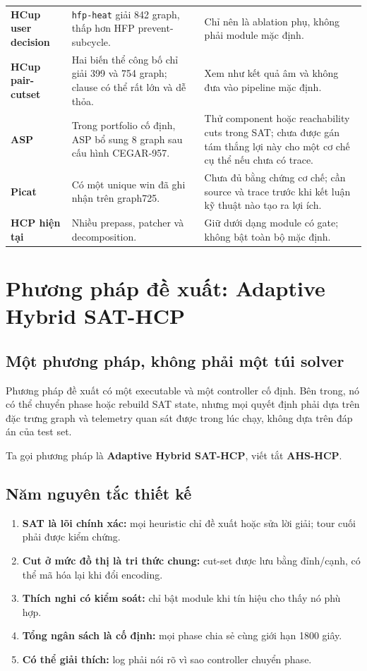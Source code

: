 \documentclass[11pt,a4paper,oneside]{scrreprt}
\newcommand{\code}[1]{\texttt{#1}}
\begin{document}
\begin{longtable}{>{\raggedright\arraybackslash\bfseries\sffamily}p{28mm} >{\raggedright\arraybackslash}p{50mm} >{\raggedright\arraybackslash}p{66mm}}
HCup user decision & \code{hfp-heat} giải 842 graph, thấp hơn HFP prevent-subcycle. & Chỉ nên là ablation phụ, không phải module mặc định. \\
HCup pair-cutset & Hai biến thể công bố chỉ giải 399 và 754 graph; clause có thể rất lớn và dễ thỏa. & Xem như kết quả âm và không đưa vào pipeline mặc định. \\
ASP & Trong portfolio cố định, ASP bổ sung 8 graph sau cấu hình CEGAR-957. & Thử component hoặc reachability cuts trong SAT; chưa được gán tám thắng lợi này cho một cơ chế cụ thể nếu chưa có trace. \\
Picat & Có một unique win đã ghi nhận trên graph725. & Chưa đủ bằng chứng cơ chế; cần source và trace trước khi kết luận kỹ thuật nào tạo ra lợi ích. \\
HCP hiện tại & Nhiều prepass, patcher và decomposition. & Giữ dưới dạng module có gate; không bật toàn bộ mặc định. \\
\bottomrule
\end{longtable}

\chapter{Phương pháp đề xuất: Adaptive Hybrid SAT-HCP}

\section{Một phương pháp, không phải một túi solver}

Phương pháp đề xuất có một executable và một controller cố định. Bên trong, nó có thể chuyển phase hoặc rebuild SAT state, nhưng mọi quyết định phải dựa trên đặc trưng graph và telemetry quan sát được trong lúc chạy, không dựa trên đáp án của test set.

Ta gọi phương pháp là \textbf{Adaptive Hybrid SAT-HCP}, viết tắt \textbf{AHS-HCP}.

\section{Năm nguyên tắc thiết kế}

\begin{enumerate}
  \item \textbf{SAT là lõi chính xác:} mọi heuristic chỉ đề xuất hoặc sửa lời giải; tour cuối phải được kiểm chứng.
  \item \textbf{Cut ở mức đồ thị là tri thức chung:} cut-set được lưu bằng đỉnh/cạnh, có thể mã hóa lại khi đổi encoding.
  \item \textbf{Thích nghi có kiểm soát:} chỉ bật module khi tín hiệu cho thấy nó phù hợp.
  \item \textbf{Tổng ngân sách là cố định:} mọi phase chia sẻ cùng giới hạn 1800 giây.
  \item \textbf{Có thể giải thích:} log phải nói rõ vì sao controller chuyển phase.
\end{enumerate}
\end{document}
